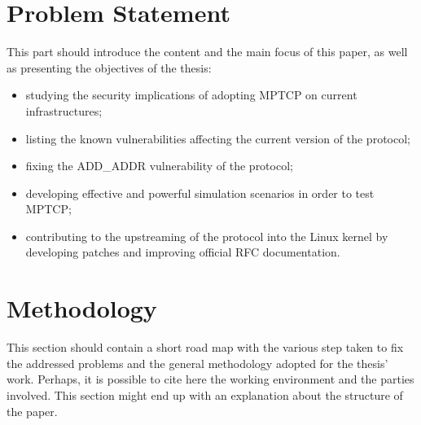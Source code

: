 \section{Problem Statement}
This part should introduce the content and the main focus of this paper, as well as presenting the objectives of the thesis:
\begin{itemize}
    \item studying the security implications of adopting MPTCP on current infrastructures; 
    \item listing the known vulnerabilities affecting the current version of the protocol; 
    \item fixing the ADD\_ADDR vulnerability of the protocol; 
    \item developing effective and powerful simulation scenarios in order to test MPTCP;
    \item contributing to the upstreaming of the protocol into the Linux kernel by developing patches and improving official RFC documentation.
\end{itemize}

\section{Methodology}
This section should contain a short road map with the various step taken to fix the addressed problems and the general methodology adopted for the thesis' work.
Perhaps, it is possible to cite here the working environment and the parties involved. 
This section might end up with an explanation about the structure of the paper.
